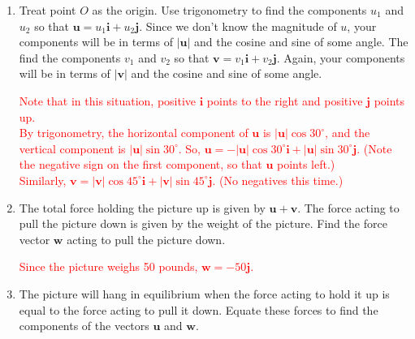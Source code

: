 \documentclass[10pt]{article}
\newcommand{\vu}{\mathbf{u}}
\newcommand{\vv}{\mathbf{v}}
\newcommand{\vw}{\mathbf{w}}
\newcommand{\vi}{\mathbf{i}}
\newcommand{\vj}{\mathbf{j}}
\newcommand{\red}[1]{ %
\textcolor{red}{#1} }%
\begin{document}
\begin{enumerate}[leftmargin=0pt]
\begin{minipage}[t]{0.4\linewidth}
    \end{minipage}
    \begin{enumerate}
        \item Treat point $O$ as the origin. Use trigonometry to find the components $u_1$ and $u_2$ so that $\vu = u_1 \vi + u_2 \vj$. Since we don't know the magnitude of $u$, your components will be in terms of $|\vu|$ and the cosine and sine of some angle. The find the components $v_1$ and $v_2$ so that $\vv =v_1 \vi + v_2 \vj$. Again, your components will be in terms of $|\vv|$ and the cosine and sine of some angle.
        
        \red{Note that in this situation, positive $\vi$ points to the right and positive $\vj$ points up.\\
        By trigonometry, the horizontal component of $\vu$ is $|\vu|\cos30^\circ$, and the vertical component is $|\vu|\sin30^\circ$. So, $\vu = -|\vu|\cos30^\circ \vi + |\vu|\sin30^\circ \vj$. (Note the negative sign on the first component, so that $\vu$ points left.)\\
        Similarly, $\vv = |\vv|\cos45^\circ \vi + |\vv|\sin45^\circ \vj$. (No negatives this time.)
        }
        \item The total force holding the picture up is given by $\vu + \vv$. The force acting to pull the picture down is given by the weight of the picture. Find the force vector $\vw$ acting to pull the picture down.
        
        \red{Since the picture weighs 50 pounds, $\vw = -50\vj$.}
        \item The picture will hang in equilibrium when the force acting to hold it up is equal to the force acting to pull it down. Equate these forces to find the components of the vectors $\vu$ and $\vw$.
        

\end{enumerate}
\end{enumerate}
\end{document}
